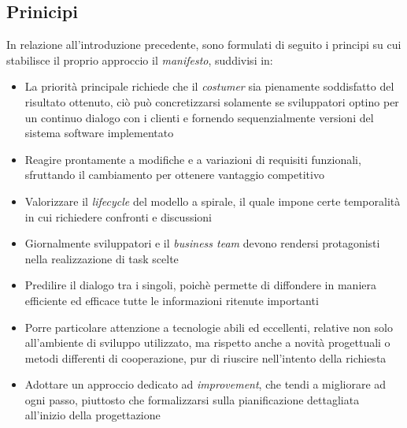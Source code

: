 \documentclass{article}
\begin{document}
\subsection*{Prinicipi}
\large
In relazione all'introduzione precedente, sono formulati di seguito i principi su cui stabilisce il proprio approccio il \textit{manifesto}, suddivisi in:
\begin{itemize}[label={-}]
    \itemsep0em
    \item La priorità principale richiede che il \textit{costumer} sia pienamente soddisfatto del risultato ottenuto, ciò può concretizzarsi solamente se sviluppatori optino per un continuo dialogo con i clienti e fornendo sequenzialmente versioni del sistema software implementato
    \item Reagire prontamente a modifiche e a variazioni di requisiti funzionali, sfruttando il cambiamento per ottenere vantaggio competitivo
    \item Valorizzare il \textit{lifecycle} del modello a spirale, il quale impone certe temporalità in cui richiedere confronti e discussioni
    \item Giornalmente sviluppatori e il \textit{business team} devono rendersi protagonisti nella realizzazione di task scelte
    \item Predilire il dialogo tra i singoli, poichè permette di diffondere in maniera efficiente ed efficace tutte le informazioni ritenute importanti
    \item Porre particolare attenzione a tecnologie abili ed eccellenti, relative non solo all'ambiente di sviluppo utilizzato, ma rispetto anche a novità progettuali o metodi differenti di cooperazione, pur di riuscire nell'intento della richiesta
    \item Adottare un approccio dedicato ad \textit{improvement}, che tendi a migliorare ad ogni passo, piuttosto che formalizzarsi sulla pianificazione dettagliata all'inizio della progettazione
\end{itemize}
\end{document}
